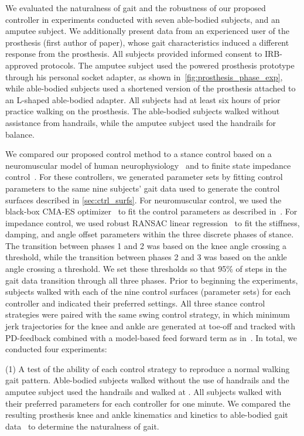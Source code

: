 We evaluated the naturalness of gait and the robustness of our proposed
controller in experiments conducted with seven able-bodied subjects, and an
amputee subject. We additionally present data from an experienced user of the
prosthesis (first author of paper), whose gait characteristics induced a
different response from the prosthesis. All subjects provided informed consent
to IRB-approved protocols. The amputee subject used the powered prosthesis
prototype through his personal socket adapter, as shown
in~\cref{fig:prosthesis_phase_exp}, while able-bodied subjects used a shortened
version of the prosthesis attached to an L-shaped able-bodied adapter. All
subjects had at least six hours of prior practice walking on the prosthesis. The
able-bodied subjects walked without assistance from handrails, while the amputee
subject used the handrails for balance.

We compared our proposed control method to a stance control based on a
neuromuscular model of human neurophysiology~\citep{thatte2018method} and to
finite state impedance control~\citep{lawson2014robotic}. For these controllers,
we generated parameter sets by fitting control parameters to the same nine
subjects' gait data used to generate the control surfaces described in
\cref{sec:ctrl_surfs}. For neuromuscular control, we used the black-box CMA-ES
optimizer~\citep{hansen2006cma} to fit the control parameters as described
in~\citep{thatte2018method}. For impedance control, we used robust RANSAC linear
regression~\citep{fischler1981random} to fit the stiffness, damping, and angle
offset parameters within the three discrete phases of stance. The transition
between phases 1 and 2 was based on the knee angle crossing a threshold, while
the transition between phases 2 and 3 was based on the ankle angle crossing a
threshold. We set these thresholds so that 95\% of steps in the gait data
transition through all three phases. Prior to beginning the experiments,
subjects walked with each of the nine control surfaces (parameter sets) for each
controller and indicated their preferred settings. All three stance control
strategies were paired with the same swing control strategy, in which minimum
jerk trajectories for the knee and ankle are generated at toe-off and tracked
with PD-feedback combined with a model-based feed forward term as
in~\citep{lenzi2014speed}. In total, we conducted four experiments: 

(1) A test of the ability of each control strategy to reproduce a normal walking
gait pattern.  Able-bodied subjects walked without the use of handrails
 and the amputee subject used the handrails and walked at
.  All subjects walked with their preferred parameters for
each controller for one minute. We compared the resulting prosthesis knee and
ankle kinematics and kinetics to able-bodied gait data~\citep{bovi2011multiple}
to determine the naturalness of gait.

